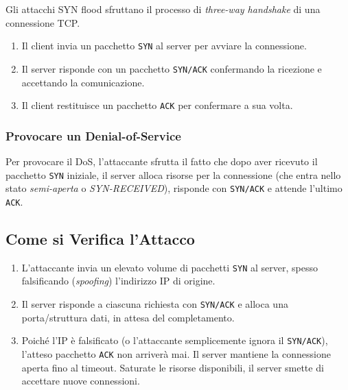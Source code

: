 Gli attacchi SYN flood sfruttano il processo di \textit{three-way handshake} di una connessione TCP.
\begin{enumerate}
    \item Il client invia un pacchetto \texttt{SYN} al server per avviare la connessione.
    \item Il server risponde con un pacchetto \texttt{SYN/ACK} confermando la ricezione e accettando la comunicazione.
    \item Il client restituisce un pacchetto \texttt{ACK} per confermare a sua volta.
\end{enumerate}

\subsubsection{Provocare un Denial-of-Service}

Per provocare il DoS, l'attaccante sfrutta il fatto che dopo aver ricevuto il pacchetto \texttt{SYN} iniziale, il server alloca risorse per la connessione (che entra nello stato \textit{semi-aperta} o \textit{SYN-RECEIVED}), risponde con \texttt{SYN/ACK} e attende l'ultimo \texttt{ACK}.

\subsection{Come si Verifica l'Attacco}
\begin{enumerate}
    \item L'attaccante invia un elevato volume di pacchetti \texttt{SYN} al server, spesso falsificando (\textit{spoofing}) l'indirizzo IP di origine.
    \item Il server risponde a ciascuna richiesta con \texttt{SYN/ACK} e alloca una porta/struttura dati, in attesa del completamento.
    \item Poiché l'IP è falsificato (o l'attaccante semplicemente ignora il \texttt{SYN/ACK}), l'atteso pacchetto \texttt{ACK} non arriverà mai. Il server mantiene la connessione aperta fino al timeout. Saturate le risorse disponibili, il server smette di accettare nuove connessioni.
\end{enumerate}

